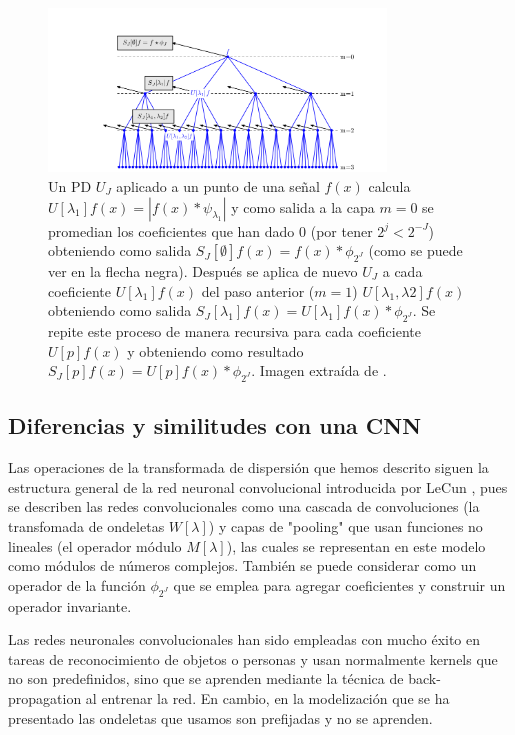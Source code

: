 \begin{figure} [!h]
  \centering
  \includegraphics[width=0.8\textwidth]{img/ScatteringPropagator.png}
  \caption{Un PD $U_J$ aplicado a un punto de una señal $f(x)$ calcula $U[\lambda_1]f(x)=|f(x)\ast \psi_{\lambda_1}|$ y como salida a la capa $m=0$ se promedian los coeficientes que han dado $0$ (por tener $2^j<2^{-J}$) obteniendo como salida $S_J[\emptyset]f(x)=f(x)\ast \phi_{2^J}$ (como se puede ver en la flecha negra). Después se aplica de nuevo $U_J$ a cada coeficiente $U[\lambda_1]f(x)$ del paso anterior ($m=1$) $U[\lambda_1,\lambda2]f(x)$ obteniendo como salida $S_J[\lambda_1]f(x)=U[\lambda_1]f(x) \ast \phi_{2^J}$. Se repite este proceso de manera recursiva para cada coeficiente $U[p]f(x)$ y obteniendo como resultado $S_J[p]f(x)=U[p]f(x) \ast \phi_{2^J}$. Imagen extraída de \cite{bruna2013invariant}.}
  \label{fig:arbol_propag}
\end{figure}


\subsection{Diferencias y similitudes con una CNN}


Las operaciones de la transformada de dispersión que hemos descrito siguen la estructura general de la red neuronal convolucional introducida por LeCun \cite{lecun2015deep}, pues se describen las redes convolucionales como una cascada de convoluciones (la transfomada de ondeletas $W[\lambda]$) y capas de "pooling" que usan funciones no lineales (el operador módulo $M[\lambda]$), las cuales se representan en este modelo como módulos de números complejos. También se puede considerar como un operador de  la función $\phi_{2^J}$ que se emplea para agregar coeficientes y construir un operador invariante.

\medskip

\noindent Las redes neuronales convolucionales han sido empleadas con mucho éxito en tareas de reconocimiento de objetos o personas y usan normalmente kernels que no son predefinidos, sino que se aprenden mediante la técnica de back-propagation al entrenar la red. En cambio, en la modelización que se ha presentado las ondeletas que usamos son prefijadas y no se aprenden.


